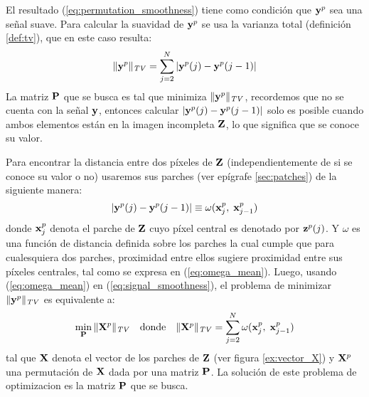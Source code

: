 El resultado (\ref{eq:permutation_smoothness}) tiene como condici\'on que $\y^p$ sea una señal suave. Para calcular la suavidad de $\y^p$ se usa la varianza total (definici\'on \ref{def:tv}), que en este caso resulta:
\begin{equation}
	\|\y^p\|_{\mathit{TV}} = \sum_{j = 2}^{N}|\y^{p}(j) - \y^{p}(j - 1)|
	\label{eq:signal_smoothness}
\end{equation}
La matriz $\P$ que se busca es tal que minimiza $\|\y^p\|_{\mathit{TV}}$, recordemos que no se cuenta con la señal  $\y$, entonces calcular $|\y^{p}(j) - \y^{p}(j - 1)|$ solo es posible cuando ambos elementos est\'an en la imagen incompleta $\Z$, lo que significa que se conoce su valor.

Para encontrar la distancia entre dos p\'ixeles de $\Z$ (independientemente de si se conoce su valor o no) usaremos sus parches (ver epígrafe \ref{sec:patches}) de la siguiente manera:
\begin{equation}
	|\y^{p}(j) - \y^{p}(j - 1)| \equiv \omega(\x_j^p,\; \x_{j - 1}^p)
	\label{eq:omega_mean}
\end{equation}
donde $\x_j^p$ denota el parche de $\Z$ cuyo p\'ixel central es denotado por $\z^p(j)$. Y $\omega$ es una funci\'on de distancia definida sobre los parches la cual cumple que para cualesquiera dos parches, proximidad entre ellos sugiere proximidad entre sus p\'ixeles centrales, tal como se expresa en (\ref{eq:omega_mean}). Luego, usando (\ref{eq:omega_mean}) en (\ref{eq:signal_smoothness}), el problema de minimizar $\|\y^p\|_{\mathit{TV}}$ es equivalente a:
\begin{equation}
	\begin{array}{ccc}
		\displaystyle\min_\P \|\X^p\|_{\mathit{TV}} & \mbox{donde} & \|\X^p\|_{\mathit{TV}}  = \displaystyle\sum_{j = 2}^{N}\omega(\x_j^{p},\; \x_{j - 1}^{p})
	\end{array}
	\label{eq:path_smoothness}
\end{equation}
tal que $\X$ denota el vector de los parches de $\Z$ (ver figura \ref{ex:vector_X}) y $\X^p$ una permutaci\'on de $\X$ dada por una matriz $\P$. La soluci\'on de este problema de optimizacion es la matriz $\P$ que se busca.
